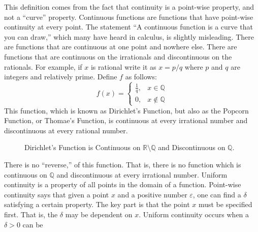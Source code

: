             This definition comes from the fact that
            continuity is a point-wise property, and not a
            ``curve'' property. Continuous functions are
            functions that have point-wise continuity at
            every point. The statement ``A continuous function
            is a curve that you can draw,'' which many have
            heard in calculus, is slightly misleading. There
            are functions that are continuous at one point and
            nowhere else. There are functions that are
            continuous on the irrationals and discontinuous
            on the rationals. For example, if $x$ is
            rational write it as $x=p/q$ where $p$ and
            $q$ are integers and relatively prime. Define $f$
            as follows:
            \begin{equation}
                f(x)=
                \begin{cases}
                    \frac{1}{q},&x\in\mathbb{Q}\\
                    0,&x\notin\mathbb{Q}
                \end{cases}
            \end{equation}
            This function, which is known as
            Dirichlet's Function, but also as the Popcorn
            Function, or Thomae's Function, is continuous at every
            irrational number and discontinuous at every
            rational number.
            \begin{figure}[H]
                \captionsetup{type=figure}
                \centering
                
                \caption{Dirichlet's Function is Continuous on
                         $\mathbb{R}\setminus\mathbb{Q}$ and
                         Discontinuous on $\mathbb{Q}$.}
                \label{fig:Funct:Dirichlet_Thomae_Function}
            \end{figure}
            There is no ``reverse,'' of this
            function. That is, there is no function which is
            continuous on $\mathbb{Q}$ and discontinuous at
            every irrational number. Uniform continuity is a
            property of all points in the domain of a function.
            Point-wise continuity says that given a point $x$
            and a positive number
            $\varepsilon$, one can find a $\delta$ satisfying a
            certain property. The key part is that the point $x$ must
            be specified first. That is, the $\delta$
            may be dependent on $x$.
            Uniform continuity occurs when a $\delta>0$ can be
